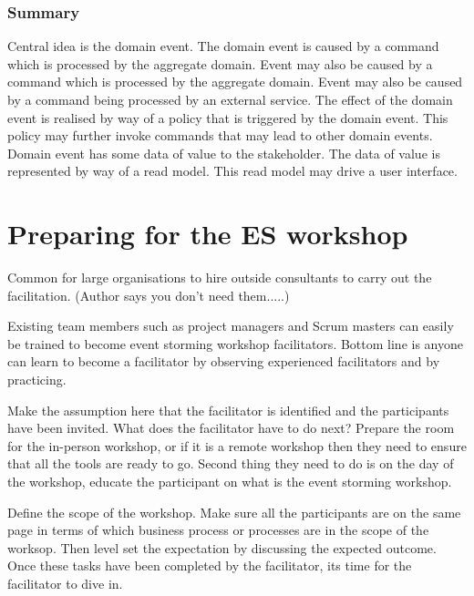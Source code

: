 \documentclass[a4paper, 11pt]{book}
\begin{document}
    \subsubsection{Summary}
    Central idea is the domain event.
    The domain event is caused by a command which is processed by the aggregate domain.
    Event may also be caused by a command which is processed by the aggregate domain.
    Event may also be caused by a command being processed by an external service.
    The effect of the domain event is realised by way of a policy that is triggered by the domain event.
    This policy may further invoke commands that may lead to other domain events.
    Domain event has some data of value to the stakeholder.
    The data of value is represented by way of a read model.
    This read model may drive a user interface.


    \section{Preparing for the ES workshop}

    Common for large organisations to hire outside consultants to carry out the facilitation.
    (Author says you don't need them.....)

    Existing team members such as project managers and Scrum masters can easily be trained to become event storming workshop facilitators.
    Bottom line is anyone can learn to become a facilitator by observing experienced facilitators and by practicing.

    Make the assumption here that the facilitator is identified and the participants have been invited.
    What does the facilitator have to do next?
    Prepare the room for the in-person workshop, or if it is a remote workshop then they need to ensure that all the tools are ready to go.
    Second thing they need to do is on the day of the workshop, educate the participant on what is the event storming workshop.

    Define the scope of the workshop. Make sure all the participants are on the same page in terms of which business process or processes are in the scope of the worksop.
    Then level set the expectation by discussing the expected outcome.
    Once these tasks have been completed by the facilitator, its time for the facilitator to dive in.
\end{document}
